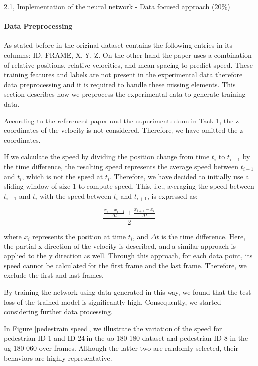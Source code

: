 \begin{task}{2.1, Implementation of the neural network - Data focused approach (20\%)}

\paragraph{Data Preprocessing}
As stated before in the original dataset contains the following entries in its columns: ID, FRAME, X, Y, Z. On the other hand the paper uses a combination of relative positions, relative velocities, and mean spacing to predict speed. These training features and labels are not present in the experimental data therefore data preprocessing and it is required to handle these missing elements. This section describes how we preprocess the experimental data to generate training data.

According to the referenced paper and the experiments done in Task 1, the z coordinates of the velocity is not considered. Therefore, we have omitted the z coordinates.

If we calculate the speed by dividing the position change from time $t_i$ to $t_{i-1}$ by the time difference, the resulting speed represents the average speed between $t_{i-1}$ and $t_i$, which is not the speed at $t_i$. Therefore, we have decided to initially use a sliding window of size 1 to compute speed. This, i.e., averaging the speed between $t_{i-1}$ and $t_i$ with the speed between $t_i$ and $t_{i+1}$, is expressed as:

\[
\frac{\frac{x_i - x_{i-1}}{\Delta t} + \frac{x_{i+1} - x_i}{\Delta t}}{2}
\]

where $x_i$ represents the position at time $t_i$, and $\Delta t$ is the time difference. Here, the partial x direction of the velocity is described, and a similar approach is applied to the y direction as well. Through this approach, for each data point, its speed cannot be calculated for the first frame and the last frame. Therefore, we exclude the first and last frames.

By training the network using data generated in this way, we found that the test loss of the trained model is significantly high. Consequently, we started considering further data processing.

In Figure \ref{pedestrain speed}, we illustrate the variation of the speed for pedestrian ID 1 and ID 24 in the uo-180-180 dataset and pedestrian ID 8 in the ug-180-060 over frames. Although the latter two are randomly selected, their behaviors are highly representative.


\end{task}
